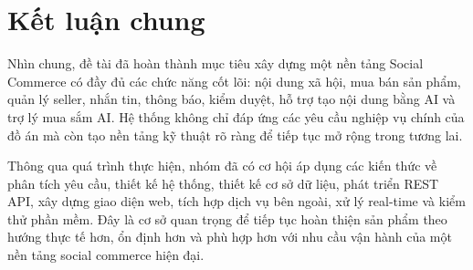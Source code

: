 \section{Kết luận chung}

Nhìn chung, đề tài đã hoàn thành mục tiêu xây dựng một nền tảng Social Commerce có đầy đủ các chức năng cốt lõi: nội dung xã hội, mua bán sản phẩm, quản lý seller, nhắn tin, thông báo, kiểm duyệt, hỗ trợ tạo nội dung bằng AI và trợ lý mua sắm AI. Hệ thống không chỉ đáp ứng các yêu cầu nghiệp vụ chính của đồ án mà còn tạo nền tảng kỹ thuật rõ ràng để tiếp tục mở rộng trong tương lai.

Thông qua quá trình thực hiện, nhóm đã có cơ hội áp dụng các kiến thức về phân tích yêu cầu, thiết kế hệ thống, thiết kế cơ sở dữ liệu, phát triển REST API, xây dựng giao diện web, tích hợp dịch vụ bên ngoài, xử lý real-time và kiểm thử phần mềm. Đây là cơ sở quan trọng để tiếp tục hoàn thiện sản phẩm theo hướng thực tế hơn, ổn định hơn và phù hợp hơn với nhu cầu vận hành của một nền tảng social commerce hiện đại.
